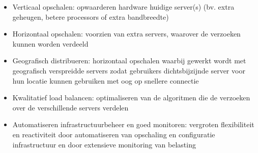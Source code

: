 \begin{itemize}
    \item Verticaal opschalen: opwaarderen hardware huidige server(s)
    (bv. extra geheugen, betere processors of extra bandbreedte)

    \item Horizontaal opschalen: voorzien van extra servers,
    waarover de verzoeken kunnen worden verdeeld

    \item Geografisch distribueren: horizontaal opschalen
    waarbij gewerkt wordt met geografisch verspreidde servers
    zodat gebruikers dichtsbijzijnde server voor hun locatie kunnen gebruiken
    met oog op snellere connectie

    \item Kwalitatief load balancen: optimaliseren van de algoritmen die
    de verzoeken over de verschillende servers verdelen

    \item Automatiseren infrastructuurbeheer en goed monitoren: vergroten
    flexibiliteit en reactiviteit door automatiseren van opschaling en
    configuratie infrastructuur en door extensieve monitoring van belasting
    

\end{itemize}
